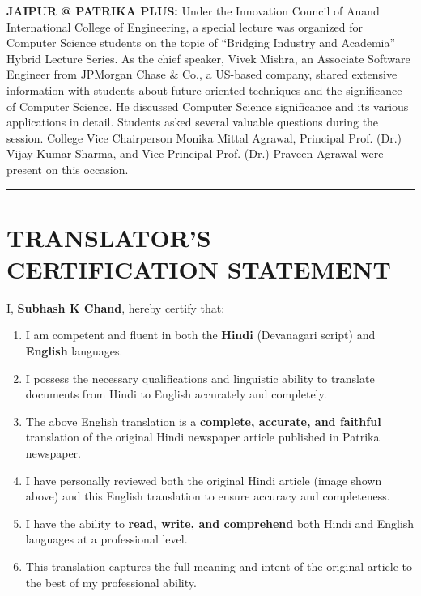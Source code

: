 \documentclass[12pt,letterpaper]{article}
\begin{document}
\noindent\textbf{JAIPUR @ PATRIKA PLUS:} Under the Innovation Council of Anand International College of Engineering, a special lecture was organized for Computer Science students on the topic of ``Bridging Industry and Academia'' Hybrid Lecture Series. As the chief speaker, Vivek Mishra, an Associate Software Engineer from JPMorgan Chase \& Co., a US-based company, shared extensive information with students about future-oriented techniques and the significance of Computer Science. He discussed Computer Science significance and its various applications in detail. Students asked several valuable questions during the session. College Vice Chairperson Monika Mittal Agrawal, Principal Prof. (Dr.) Vijay Kumar Sharma, and Vice Principal Prof. (Dr.) Praveen Agrawal were present on this occasion.

\vspace{1cm}

\noindent\rule{\textwidth}{1.5pt}

\section*{TRANSLATOR'S CERTIFICATION STATEMENT}

\noindent I, \textbf{Subhash K Chand}, hereby certify that:

\begin{enumerate}
    \item I am competent and fluent in both the \textbf{Hindi} (Devanagari script) and \textbf{English} languages.
    
    \item I possess the necessary qualifications and linguistic ability to translate documents from Hindi to English accurately and completely.
    
    \item The above English translation is a \textbf{complete, accurate, and faithful} translation of the original Hindi newspaper article published in Patrika newspaper.
    
    \item I have personally reviewed both the original Hindi article (image shown above) and this English translation to ensure accuracy and completeness.
    
    \item I have the ability to \textbf{read, write, and comprehend} both Hindi and English languages at a professional level.
    
    \item This translation captures the full meaning and intent of the original article to the best of my professional ability.
\end{enumerate}
\end{document}

